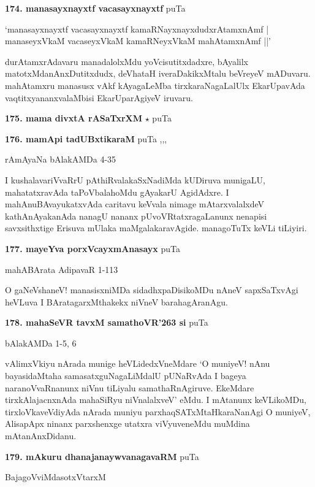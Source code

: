 \medskip
\noindent\textbf{174. manasayxnayxtf vacasayxnayxtf} \hfill puTa \pageref{102}

\begin{shloka}
`manasayxnayxtf vacasayxnayxtf kamaRNayxnayxdudxrAtamxnAmf |\\
manaseyxVkaM vacaseyxVkaM kamaRNeyxVkaM mahAtamxnAmf ||'
\end{shloka}

durAtamxrAdavaru manadalolxMdu yoVcisutitxdadxre, bAyalilx matotxMdanAnxDutitxdudx, deVhataH iveraDakikxMtalu beVreyeV mADuvaru. mahAtamxru manasusx vAkf kAyagaLeMba tirxkaraNagaLalUlx EkarUpavAda vaqtitxyananxvalaMbisi EkarUparAgiyeV iruvaru.

\medskip
\noindent\textbf{175. mama divxtA rASaTxrXM} $\star$ \hfill puTa \pageref{148a}

\medskip
\noindent\textbf{176. mamApi tadUBxtikaraM} \hfill puTa \pageref{159a},\pageref{168b},\pageref{193a},\pageref{211d}

\hfill rAmAyaNa bAlakAMDa 4-35

I kushalavariVvaRrU pAthiRvalakaSxNadiMda kUDiruva munigaLU, mahatatxravAda taPoVbalahoMdu gAyakarU AgidAdxre. I mahAnuBAvayukatxvAda caritavu keVvala nimage mAtarxvalalxdeV kathAnAyakanAda nanagU nananx pUvoVRtatxragaLanunx nenapisi savxsithxtige Erisuva mUlaka maMgalakaravAgide. managoTuTx keVLi tiLiyiri.

\medskip
\noindent\textbf{177. mayeYva porxVcayxmAnasayx} \hfill puTa \pageref{119c}

\hfill mahABArata AdipavaR 1-113

O gaNeVshaneV! manasisxniMDa sidadhxpaDisikoMDu nAneV sapxSaTxvAgi heVLuva I BAratagarxMthakekx niVneV barahagAranAgu.

\medskip
\noindent\textbf{178. mahaSeVR tavxM samathoVR\char'263 si} \hfill puTa \pageref{246a}

\hfill bAlakAMDa 1-5, 6

vAlimxVkiyu nArada munige heVLidedxVneMdare `O muniyeV! nAnu bayasidaMtaha samasatxguNagaLiMdalU pUNaRvAda I bageya naranoVvaRnanunx niVnu tiLiyalu samathaRnAgiruve. EkeMdare tirxkAlajacnxnAda mahaSiRyu niVnalalxveV' eMdu. I mAtanunx keVLikoMDu, tirxloVkaveVdiyAda nArada muniyu parxhaqSATxMtaHkaraNanAgi O muniyeV, AlisapApx ninanx parxshenxge utatxra viVyuveneMdu muMdina mAtanAnxDidanu.

\medskip
\noindent\textbf{179. mAkuru dhanajanaywvanagavaRM} \hfill puTa \pageref{60}

\hfill BajagoVviMdasotxVtarxM 

